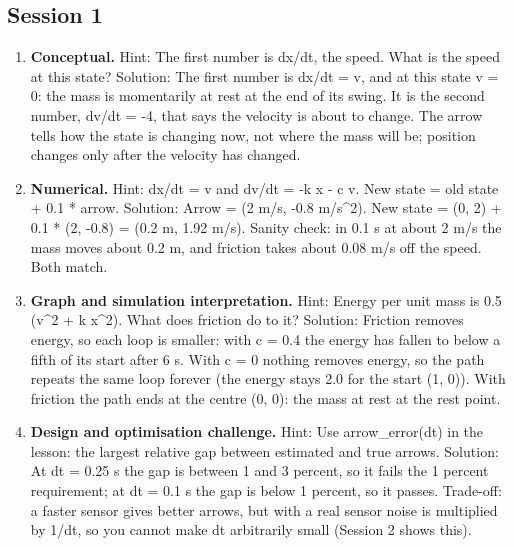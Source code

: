 \documentclass[11pt,a4paper]{article}
\begin{document}
\subsection*{Session 1}
\begin{enumerate}[nosep]
\item \textbf{Conceptual.} Hint: The first number is dx/dt, the speed. What is the speed at this state? Solution: The first number is dx/dt = v, and at this state v = 0: the mass is momentarily at rest at the end of its swing. It is the second number, dv/dt = -4, that says the velocity is about to change. The arrow tells how the state is changing now, not where the mass will be; position changes only after the velocity has changed.
\item \textbf{Numerical.} Hint: dx/dt = v and dv/dt = -k x - c v. New state = old state + 0.1 * arrow. Solution: Arrow = (2 m/s, -0.8 m/s\textasciicircum{}2). New state = (0, 2) + 0.1 * (2, -0.8) = (0.2 m, 1.92 m/s). Sanity check: in 0.1 s at about 2 m/s the mass moves about 0.2 m, and friction takes about 0.08 m/s off the speed. Both match.
\item \textbf{Graph and simulation interpretation.} Hint: Energy per unit mass is 0.5 (v\textasciicircum{}2 + k x\textasciicircum{}2). What does friction do to it? Solution: Friction removes energy, so each loop is smaller: with c = 0.4 the energy has fallen to below a fifth of its start after 6 s. With c = 0 nothing removes energy, so the path repeats the same loop forever (the energy stays 2.0 for the start (1, 0)). With friction the path ends at the centre (0, 0): the mass at rest at the rest point.
\item \textbf{Design and optimisation challenge.} Hint: Use arrow\_error(dt) in the lesson: the largest relative gap between estimated and true arrows. Solution: At dt = 0.25 s the gap is between 1 and 3 percent, so it fails the 1 percent requirement; at dt = 0.1 s the gap is below 1 percent, so it passes. Trade-off: a faster sensor gives better arrows, but with a real sensor noise is multiplied by 1/dt, so you cannot make dt arbitrarily small (Session 2 shows this).
\end{enumerate}
\end{document}
